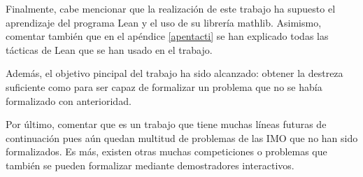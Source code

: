 Finalmente, cabe mencionar que la realización de este trabajo ha supuesto el
aprendizaje del programa Lean y el uso de su librería mathlib. Asimismo,
comentar también que en el apéndice \ref{apentacti} se han explicado todas
las tácticas de Lean que se han usado en el trabajo.

Además, el objetivo pincipal del trabajo ha sido alcanzado: obtener la destreza
suficiente como para ser capaz de formalizar un problema que no se había
formalizado con anterioridad.

Por último, comentar que es un trabajo que tiene muchas líneas futuras de
continuación pues aún quedan multitud de problemas de las IMO que no han sido
formalizados. Es más, existen otras muchas competiciones o problemas que
también se pueden formalizar mediante demostradores interactivos.


